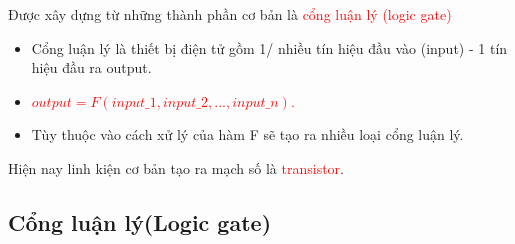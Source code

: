 \documentclass[12pt]{article}
\begin{document}
\begin{sloppypar}
Được xây dựng từ những thành phần cơ bản là \textcolor{red}{cổng luận lý (logic gate)}
\begin{itemize}
    \item Cổng luận lý là thiết bị điện tử gồm 1/ nhiều tín hiệu đầu vào (input) - 1 tín hiệu đầu ra output.
    \item \textcolor{red}{\begin{math}output = F (input\_1, input\_2, ..., input\_n)\end{math}.}
    \item Tùy thuộc vào cách xử lý của hàm F sẽ tạo ra nhiều loại cổng luận lý.
\end{itemize}

Hiện nay linh kiện cơ bản tạo ra mạch số là \textcolor{red}{transistor}.

\subsection{Cổng luận lý(Logic gate)}




\end{sloppypar}
\end{document}
